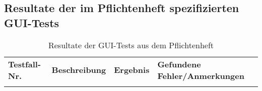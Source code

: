 \begin{landscape}

\section{Resultate der im Pflichtenheft spezifizierten GUI-Tests}

\label{guitests-pflichtenheft}

\begin{longtable}{lp{8cm}lp{10cm}}
\label{tests-pflichtenheft} \\
\caption{Resultate der GUI-Tests aus dem Pflichtenheft} \\
\toprule
\textbf{Testfall-Nr.} & \textbf{Beschreibung} & \textbf{Ergebnis} & \textbf{Gefundene Fehler/Anmerkungen} \\
\midrule
\midrule

\endhead

\endfoot


\end{longtable}
\end{landscape}

